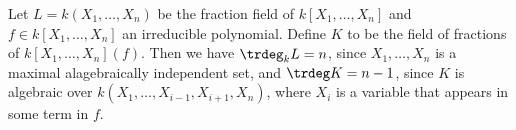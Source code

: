 Let $L = k(X_1, \ldots, X_n)$ be the fraction field of $k[X_1, \ldots, X_n]$ and
$f \in k[X_1, \ldots, X_n]$ an irreducible polynomial. Define $K$ to be
the field of fractions of $k[X_1, \ldots, X_n](f)$. Then we have
$\trdeg_k L = n$, since $X_1, \ldots, X_n$ is a maximal alagebraically independent
set, and $\trdeg K = n-1$, since $K$ is algebraic over $k(X_1, \ldots, X_{i-1}, X_{i+1}, X_n)$,
where $X_i$ is a variable that appears in some term in $f$.

